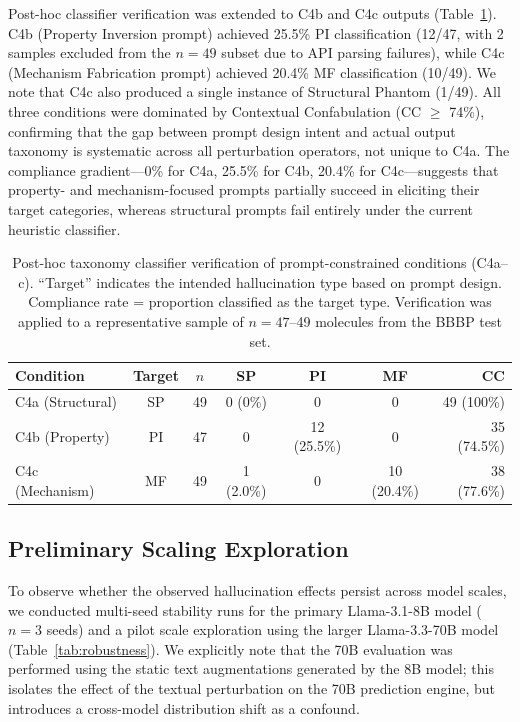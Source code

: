 Post-hoc classifier verification was extended to C4b and C4c outputs (Table~\ref{tab:c4_compliance}). C4b (Property Inversion prompt) achieved 25.5\% PI classification (12/47, with 2 samples excluded from the $n=49$ subset due to API parsing failures), while C4c (Mechanism Fabrication prompt) achieved 20.4\% MF classification (10/49). We note that C4c also produced a single instance of Structural Phantom (1/49). All three conditions were dominated by Contextual Confabulation (CC $\geq$ 74\%), confirming that the gap between prompt design intent and actual output taxonomy is systematic across all perturbation operators, not unique to C4a. The compliance gradient---0\% for C4a, 25.5\% for C4b, 20.4\% for C4c---suggests that property- and mechanism-focused prompts partially succeed in eliciting their target categories, whereas structural prompts fail entirely under the current heuristic classifier.

\begin{table}[ht]
\centering
\caption{Post-hoc taxonomy classifier verification of prompt-constrained conditions (C4a--c). ``Target'' indicates the intended hallucination type based on prompt design. Compliance rate = proportion classified as the target type. Verification was applied to a representative sample of $n=47$--49 molecules from the BBBP test set.}
\label{tab:c4_compliance}
\begin{tabular}{lcccccr}
\toprule
\textbf{Condition} & \textbf{Target} & $n$ & \textbf{SP} & \textbf{PI} & \textbf{MF} & \textbf{CC} \\ \midrule
C4a (Structural)  & SP & 49 & 0 (0\%)    & 0          & 0           & 49 (100\%) \\
C4b (Property)    & PI & 47 & 0          & 12 (25.5\%) & 0          & 35 (74.5\%) \\
C4c (Mechanism)   & MF & 49 & 1 (2.0\%)  & 0          & 10 (20.4\%) & 38 (77.6\%) \\
\bottomrule
\end{tabular}
\end{table}

\subsection{Preliminary Scaling Exploration}
To observe whether the observed hallucination effects persist across model scales, we conducted multi-seed stability runs for the primary Llama-3.1-8B model ($n=3$ seeds) and a pilot scale exploration using the larger Llama-3.3-70B model (Table~\ref{tab:robustness}). We explicitly note that the 70B evaluation was performed using the static text augmentations generated by the 8B model; this isolates the effect of the textual perturbation on the 70B prediction engine, but introduces a cross-model distribution shift as a confound.

